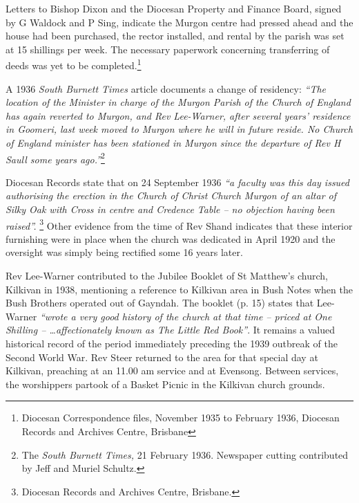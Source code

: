 Letters to Bishop Dixon and the Diocesan Property and Finance Board, signed by G Waldock and P Sing, indicate the Murgon centre had pressed ahead and the house had been purchased, the rector installed, and rental by the parish was set at 15 shillings per week. The necessary paperwork concerning transferring of deeds was yet to be completed.\footnote{Diocesan Correspondence files, November 1935 to February 1936, Diocesan Records and Archives Centre, Brisbane}


A 1936 \emph{South Burnett Times} article documents a change of residency: \emph{``The location of the Minister in charge of the Murgon Parish of the Church of England has again reverted to Murgon, and Rev Lee-Warner, after several years' residence in Goomeri, last week moved to Murgon where he will in future reside. No Church of England minister has been stationed in Murgon since the departure of Rev H Saull some years ago.''}\footnote{The \emph{South Burnett Times,} 21 February 1936. Newspaper cutting contributed by Jeff and Muriel Schultz.}


\smallskip


Diocesan Records state that on 24 September 1936 \emph{``a faculty was this day issued authorising the erection in the Church of Christ Church Murgon of an altar of Silky Oak with Cross in centre and Credence Table -- no objection having been raised''.} \footnote{Diocesan Records and Archives Centre, Brisbane.} Other evidence from the time of Rev Shand indicates that these interior furnishing were in place when the church was dedicated in April 1920 and the oversight was simply being rectified some 16 years later.


Rev Lee-Warner contributed to the Jubilee Booklet of St Matthew's church, Kilkivan in 1938, mentioning a reference to Kilkivan area in Bush Notes when the Bush Brothers operated out of Gayndah. The booklet (p. 15) states that Lee-Warner \emph{``wrote a very good history of the church at that time -- priced at One Shilling -- \ldots affectionately known as The Little Red Book''}. It remains a valued historical record of the period immediately preceding the 1939 outbreak of the Second World War. Rev Steer returned to the area for that special day at Kilkivan, preaching at an 11.00 am service and at Evensong. Between services, the worshippers partook of a Basket Picnic in the Kilkivan church grounds.




